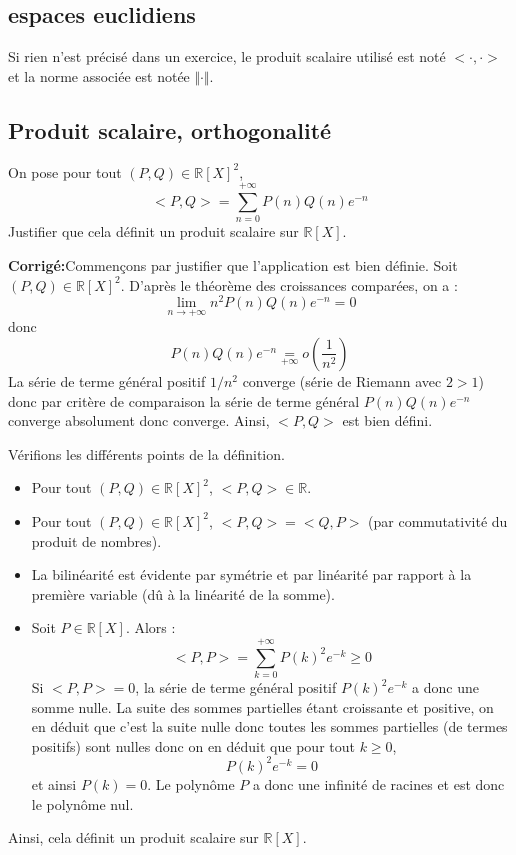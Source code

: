 \documentclass[a4paper,twoside,french,11pt]{VcCours}
\newcommand{\corr}{\textbf{Corrigé:}}
\begin{document}

\tableofcontents
\separationTitre

\subsection{espaces euclidiens}


\noindent Si rien n'est précisé dans un exercice, le produit scalaire utilisé est noté $< \cdot , \cdot >$ et la norme associée est notée $\Vert \cdot \Vert$.



\subsection{Produit scalaire, orthogonalité}


\begin{Exercice}{} On pose pour tout $(P,Q) \in \mathbb{R}[X]^2$,
$$ <P,Q> = \sum_{n=0}^{+ \infty} P(n) Q(n) e^{-n} $$
Justifier que cela définit un produit scalaire sur $\mathbb{R}[X]$.
\end{Exercice}

\corr Commençons par justifier que l'application est bien définie. Soit $(P,Q) \in \mathbb{R}[X]^2$. D'après le théorème des croissances comparées, on a :
$$ \lim_{n \rightarrow + \infty} n^2 P(n)Q(n) e^{-n} = 0$$
donc
$$ P(n)Q(n) e^{-n} \underset{+ \infty}{=} o \left( \dfrac{1}{n^2} \right)$$
La série de terme général positif $1/n^2$ converge (série de Riemann avec $2>1$) donc par critère de comparaison la série de terme général $P(n)Q(n) e^{-n}$ converge absolument donc converge. Ainsi, $<P,Q>$ est bien défini.


\noindent Vérifions les différents points de la définition.

\begin{itemize}
\item Pour tout $(P,Q) \in \mathbb{R}[X]^2$, $<P,Q> \in \mathbb{R}$.
\item Pour tout $(P,Q) \in \mathbb{R}[X]^2$, $<P,Q>= <Q,P>$ (par commutativité du produit de nombres).
\item La bilinéarité est évidente par symétrie et par linéarité par rapport à la première variable (dû à la linéarité de la somme).
\item Soit $P \in \mathbb{R}[X]$. Alors :
$$ <P,P> = \sum_{k=0}^{+\infty} P(k)^2 e^{-k} \geq 0$$
Si $<P,P>=0$, la série de terme général positif $P(k)^2 e^{-k}$ a donc une somme nulle. La suite des sommes partielles étant croissante et positive, on en déduit que c'est la suite nulle donc toutes les sommes partielles (de termes positifs) sont nulles donc on en déduit que pour tout $k \geq 0$,
$$ P(k)^2 e^{-k} = 0$$
et ainsi $P(k)=0$. Le polynôme $P$ a donc une infinité de racines et est donc le polynôme nul.
\end{itemize}
Ainsi, cela définit un produit scalaire sur $\mathbb{R}[X]$.
\end{document}
